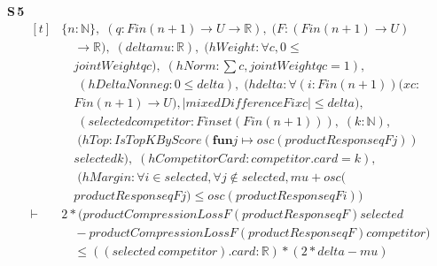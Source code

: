 \noindent\textbf{S\,5}\quad{}
{\footnotesize\[ \begin{aligned}[t]
&\{ \mathit{n} : \mathbb{N} \},\; (\mathit{q} : \mathit{Fin} (\mathit{n} + 1) \to \mathit{U} \to \mathbb{R} ),\; (\mathit{F} : (\mathit{Fin} (\mathit{n} + 1) \to \mathit{U})\\
&\quad \to \mathbb{R} ),\; (\mathit{delta} \mathit{mu} : \mathbb{R} ),\; (\mathit{hWeight} : \forall \mathit{c}, 0 \leq\\
&\quad \mathit{jointWeight} \mathit{q} \mathit{c}),\; (\mathit{hNorm} : \textstyle\sum \mathit{c}, \mathit{jointWeight} \mathit{q} \mathit{c} = 1),\\
&\quad \; (\mathit{hDeltaNonneg} : 0 \leq \mathit{delta}),\; (\mathit{hdelta} : \forall (\mathit{i} : \mathit{Fin} (\mathit{n} + 1)) (\mathit{x} \mathit{c} :\\
&\quad \mathit{Fin} (\mathit{n} + 1) \to \mathit{U}), |\mathit{mixedDifference} \mathit{F} \mathit{i} \mathit{x} \mathit{c}| \leq \mathit{delta}),\\
&\quad \; (\mathit{selected} \mathit{competitor} : \mathit{Finset} (\mathit{Fin} (\mathit{n} + 1))),\; (\mathit{k} : \mathbb{N} ),\\
&\quad \; (\mathit{hTop} : \mathit{IsTopKByScore} (\mathbf{fun} \mathit{j} \mapsto \mathit{osc} (\mathit{productResponse} \mathit{q} \mathit{F} \mathit{j}))\\
&\quad \mathit{selected} \mathit{k}),\; (\mathit{hCompetitorCard} : \mathit{competitor}.\mathit{card} = \mathit{k}),\\
&\quad \; (\mathit{hMargin} : \forall \mathit{i} \in \mathit{selected}, \forall \mathit{j} \notin \mathit{selected}, \mathit{mu} + \mathit{osc} (\\
&\quad \mathit{productResponse} \mathit{q} \mathit{F} \mathit{j}) \leq \mathit{osc} (\mathit{productResponse} \mathit{q} \mathit{F} \mathit{i}))\\
\vdash\;&2 * (\mathit{productCompressionLoss} \mathit{F} (\mathit{productResponse} \mathit{q} \mathit{F}) \mathit{selected}\\
&\quad - \mathit{productCompressionLoss} \mathit{F} (\mathit{productResponse} \mathit{q} \mathit{F}) \mathit{competitor})\\
&\quad \leq ((\mathit{selected} \ \mathit{competitor}).\mathit{card} : \mathbb{R} ) * (2 * \mathit{delta} - \mathit{mu})
\end{aligned} \]}

